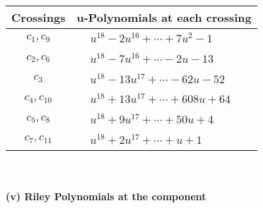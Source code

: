 \documentclass[1p]{elsarticle_modified}
\theoremstyle{definition}
\begin{document}
\begin{tabular}{m{50pt}|m{274pt}}
Crossings & \hspace{64pt}u-Polynomials at each crossing \\
\hline $$\begin{aligned}c_{1},c_{9}\end{aligned}$$&$\begin{aligned}
&u^{18}-2 u^{16}+\cdots+7 u^2-1
\end{aligned}$\\
\hline $$\begin{aligned}c_{2},c_{6}\end{aligned}$$&$\begin{aligned}
&u^{18}-7 u^{16}+\cdots-2 u-13
\end{aligned}$\\
\hline $$\begin{aligned}c_{3}\end{aligned}$$&$\begin{aligned}
&u^{18}-13 u^{17}+\cdots-62 u-52
\end{aligned}$\\
\hline $$\begin{aligned}c_{4},c_{10}\end{aligned}$$&$\begin{aligned}
&u^{18}+13 u^{17}+\cdots+608 u+64
\end{aligned}$\\
\hline $$\begin{aligned}c_{5},c_{8}\end{aligned}$$&$\begin{aligned}
&u^{18}+9 u^{17}+\cdots+50 u+4
\end{aligned}$\\
\hline $$\begin{aligned}c_{7},c_{11}\end{aligned}$$&$\begin{aligned}
&u^{18}+2 u^{17}+\cdots+u+1
\end{aligned}$\\
\hline
\end{tabular}\\~\\
\newpage\renewcommand{\arraystretch}{1}
\flushleft \textbf{(v) Riley Polynomials at the component}\newline \\
\end{document}
